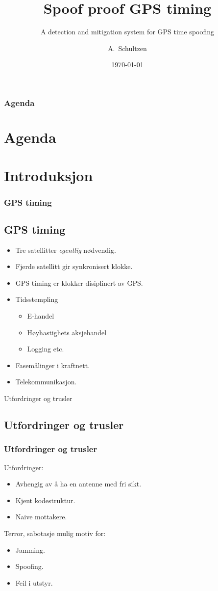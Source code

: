 \documentclass[xcolor=table]{beamer}
\title[Spoof proof GPS timing] %
{Spoof proof GPS timing}
\subtitle{A detection and mitigation system for GPS time spoofing}
\author[A. Schultzen] %
{A.~Schultzen\inst{1}}
\institute[Universities Here and There] %
{
  \inst{1}%
  Institutt for informatikk\\
  Universitetet i Oslo
}
\date{\today}
\begin{document}
\frame{\titlepage}
\begin{frame}
\frametitle{Agenda}
\section *{Agenda}
\tableofcontents
\end{frame}

\section{Introduksjon}
\begin{frame}
\frametitle{GPS timing}
	\subsection{GPS timing}
  \begin{itemize}
    \item Tre satellitter \textit{egentlig} nødvendig.
    \item Fjerde satellitt gir synkronisert klokke.   
    \item GPS timing er klokker disiplinert av GPS.
  \end{itemize}
  \begin{itemize}
    \item Tidsstempling 
    \begin{itemize}
      \item E-handel
      \item Høyhastighets aksjehandel
      \item Logging etc.
    \end{itemize}
    \item Fasemålinger i kraftnett.
    \item Telekommunikasjon.
  \end{itemize}
\end{frame}

\begin{frame}
\centering
Utfordringer og trusler
\end{frame}

\subsection{Utfordringer og trusler}
\begin{frame}
\frametitle{Utfordringer og trusler}
Utfordringer:
  \begin{itemize}
    \item Avhengig av å ha en antenne med fri sikt.
    \item Kjent kodestruktur.
    \item Naive mottakere.
  \end{itemize}
  Terror, sabotasje mulig motiv for:
  \begin{itemize}
    \item Jamming.
    \item Spoofing.
    \item Feil i utstyr.
  \end{itemize}  
\end{frame}
\end{document}
